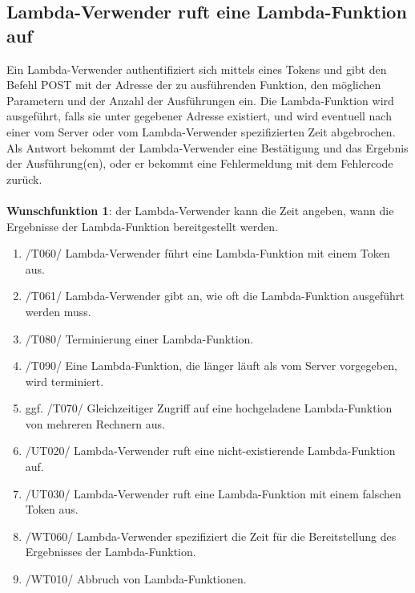 \documentclass[a4paper,20pt,oneside]{book}
\begin{document}
\subsection{\gls{Lambda-Verwender} ruft eine \gls{Lambda-Funktion} auf}
Ein \Gls{Lambda-Verwender} authentifiziert sich mittels eines \gls{Token}s und gibt den Befehl POST mit der Adresse der zu ausführenden Funktion, den möglichen Parametern und der Anzahl der Ausführungen ein. Die \gls{Lambda-Funktion} wird ausgeführt, falls sie unter gegebener Adresse existiert, und wird eventuell nach einer vom Server oder vom \Gls{Lambda-Verwender} spezifizierten Zeit abgebrochen. Als Antwort bekommt der \Gls{Lambda-Verwender} eine Bestätigung und das Ergebnis der Ausführung(en), oder er bekommt eine Fehlermeldung mit dem Fehlercode zurück.\\\\
\textbf{Wunschfunktion 1}: der \Gls{Lambda-Verwender} kann die Zeit angeben, wann die Ergebnisse der \gls{Lambda-Funktion} bereitgestellt werden.\\

\begin{enumerate}
\item /T060/ \Gls{Lambda-Verwender} führt eine \gls{Lambda-Funktion} mit einem \gls{Token} aus.
\item /T061/ \Gls{Lambda-Verwender} gibt an, wie oft die \gls{Lambda-Funktion} ausgeführt werden muss.
\item /T080/ Terminierung einer \gls{Lambda-Funktion}.
\item /T090/ Eine Lambda-Funktion, die länger läuft als vom Server vorgegeben, wird terminiert.
\item ggf. /T070/ Gleichzeitiger Zugriff auf eine hochgeladene \gls{Lambda-Funktion} von mehreren Rechnern aus.
\item /UT020/ \Gls{Lambda-Verwender} ruft eine nicht-existierende \gls{Lambda-Funktion} auf.
\item /UT030/ \Gls{Lambda-Verwender} ruft eine \gls{Lambda-Funktion} mit einem falschen \gls{Token} aus.
\item /WT060/ \Gls{Lambda-Verwender} spezifiziert die Zeit für die Bereitstellung des Ergebnisses der \gls{Lambda-Funktion}.
\item /WT010/ Abbruch von Lambda-Funktionen.
\\
\end{enumerate} 
\end{document}
